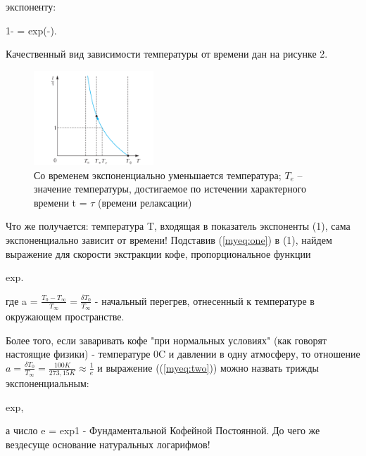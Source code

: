 \newpage
\begin{multicols*}{2}
    \noindent
    экспоненту:

	\begin{myequation}\label{myeq:one}
		1- = exp(-).	
	\end{myequation}
    
    \noindent
    Качественный вид зависимости температуры от времени дан на рисунке 2.
    \begin{figure}[H]
    	\centering\offinterlineskip
    	\includegraphics[width=0.4\textwidth]{pic1.png}
    	\caption{Со временем экспоненциально уменьшается температура; $T_e$
    		– значение температуры, достигаемое по истечении характерного
    		времени t = $\tau$ (времени релаксации)}
    \end{figure}

    Что же получается: температура T, входящая в показатель экспоненты (1), сама экспоненциально зависит от времени! Подставив (\ref{myeq:one}) в (1), найдем выражение для скорости экстракции кофе, пропорциональное функции
    \begin{myequation}\label{myeq:two}
    	exp.
    \end{myequation}
	\noindent
    где a = $\frac{T_0 - T_\infty}{T_\infty} = \frac{\delta T_0}{T_\infty}$ - начальный перегрев,
    отнесенный к температуре в окружающем пространстве.
    
    Более того, если заваривать кофе "при нормальных условиях" (как говорят настоящие физики) - температуре 
    0\degree C и давлении в одну атмосферу, то отношение $a = \frac{\delta T_0}{T_\infty} = \frac{100 K}{273,15 K} \approx
    \frac{1}{e}$ и выражение ((\ref{myeq:two})) можно назвать трижды экспоненциальным:
    \begin{myequation}\label{myeq:three}
    	exp,
    \end{myequation}
	а число e = exp1 - Фундаментальной Кофейной Постоянной. До чего же вездесуще основание натуральных логарифмов!\columnbreak
	

\end{multicols*}
